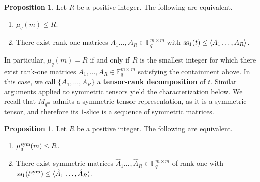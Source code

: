 \documentclass[11pt,a4paper,reqno]{article}
\numberwithin{equation}{section}
\theoremstyle{definition}
\newtheorem{proposition}[theorem]{Proposition}
\newcommand{\numberset}{\mathbb}
\newcommand{\F}{\numberset{F}}
\newcommand{\fq}{\F_q}
\def\sym{\textup{sym}}
\def\ss{\textup{ss}}
\begin{document}
\begin{proposition}\label{prop:trk}
    Let $R$ be a positive integer. The following are equivalent.
    \begin{enumerate}
        \item $\mu_q(m)\leq R$.
        \item There exist rank-one matrices $A_1\ldots,A_R\in\fq^{m\times m}$ with $\ss_1(t)\leq\langle A_1\ldots,A_R\rangle$.
    \end{enumerate}
\end{proposition}

In particular, \(\mu_q(m)=R\) if and only if \(R\) is the smallest integer for which
there exist rank-one matrices \(A_1,\ldots,A_R\in\mathbb F_q^{m\times m}\) satisfying the containment above. In this case, we call
\(\{A_1,\ldots,A_R\}\) a \textbf{tensor-rank decomposition} of \(t\).
Similar arguments applied to symmetric tensors yield the characterization below. We recall that $M_{q^m}$ admits a symmetric tensor representation, as it is a symmetric tensor, and therefore its $1$-slice is a sequence of symmetric matrices.

\begin{proposition}\label{prop:symtrk}
    Let $R$ be a positive integer. The following are equivalent.
    \begin{enumerate}
        \item $\mu_q^\sym(m)\leq R$.
        \item There exist symmetric matrices $\hat A_1\ldots,\hat A_R\in\fq^{m\times m}$ of rank one with $\ss_1(t^\sym)\leq\langle \hat A_1\ldots,\hat A_R\rangle$.
    \end{enumerate}
\end{proposition}
\end{document}
